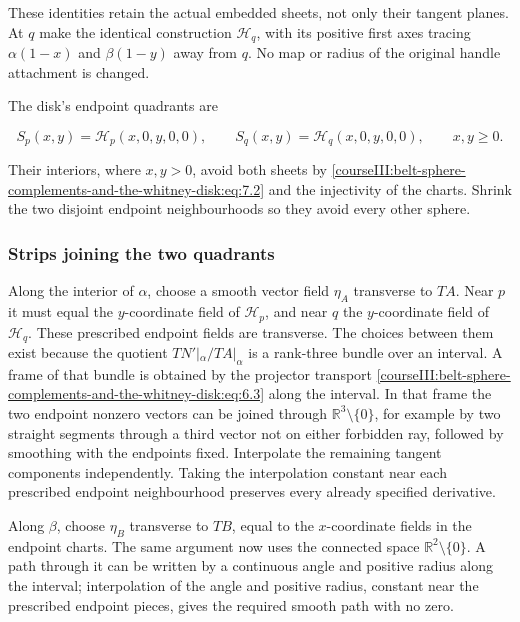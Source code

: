 These identities retain the actual embedded sheets, not only their tangent planes. At \(q\) make the identical construction \(\mathcal H_q\), with its positive first axes tracing \(\alpha(1-x)\) and \(\beta(1-y)\) away from \(q\). No map or radius of the original handle attachment is changed.

The disk's endpoint quadrants are

\begin{equation}
S_p(x,y)=\mathcal H_p(x,0,y,0,0),\qquad
S_q(x,y)=\mathcal H_q(x,0,y,0,0),\qquad x,y\geq0.
\label{courseIII:belt-sphere-complements-and-the-whitney-disk:eq:7.3}
\end{equation}

Their interiors, where \(x,y>0\), avoid both sheets by \eqref{courseIII:belt-sphere-complements-and-the-whitney-disk:eq:7.2} and the injectivity of the charts. Shrink the two disjoint endpoint neighbourhoods so they avoid every other sphere.

\subsubsection{Strips joining the two quadrants}
\label{courseIII:belt-sphere-complements-and-the-whitney-disk:section-7.2}

Along the interior of \(\alpha\), choose a smooth vector field \(\eta_A\) transverse to \(TA\). Near \(p\) it must equal the \(y\)-coordinate field of \(\mathcal H_p\), and near \(q\) the \(y\)-coordinate field of \(\mathcal H_q\). These prescribed endpoint fields are transverse. The choices between them exist because the quotient \(TN'|_\alpha/TA|_\alpha\) is a rank-three bundle over an interval. A frame of that bundle is obtained by the projector transport \eqref{courseIII:belt-sphere-complements-and-the-whitney-disk:eq:6.3} along the interval. In that frame the two endpoint nonzero vectors can be joined through \(\mathbb R^3\setminus\{0\}\), for example by two straight segments through a third vector not on either forbidden ray, followed by smoothing with the endpoints fixed. Interpolate the remaining tangent components independently. Taking the interpolation constant near each prescribed endpoint neighbourhood preserves every already specified derivative.

Along \(\beta\), choose \(\eta_B\) transverse to \(TB\), equal to the \(x\)-coordinate fields in the endpoint charts. The same argument now uses the connected space \(\mathbb R^2\setminus\{0\}\). A path through it can be written by a continuous angle and positive radius along the interval; interpolation of the angle and positive radius, constant near the prescribed endpoint pieces, gives the required smooth path with no zero.

